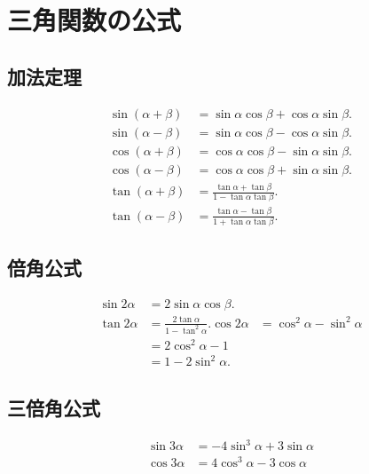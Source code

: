 ﻿%
    \section{三角関数の公式}
        \subsection{加法定理}
            \begin{align}
                \sin(\alpha+\beta) &= \sin\alpha\cos\beta + \cos\alpha\sin\beta. \\
                \sin(\alpha-\beta) &= \sin\alpha\cos\beta - \cos\alpha\sin\beta. \\
                \cos(\alpha+\beta) &= \cos\alpha\cos\beta - \sin\alpha\sin\beta. \\
                \cos(\alpha-\beta) &= \cos\alpha\cos\beta + \sin\alpha\sin\beta. \\
                \tan(\alpha+\beta) &= \frac{\tan\alpha+\tan\beta}{1-\tan\alpha\tan\beta}. \\
                \tan(\alpha-\beta) &= \frac{\tan\alpha-\tan\beta}{1+\tan\alpha\tan\beta}.
            \end{align}

        \subsection{倍角公式}
            \begin{align}
                \sin2\alpha &= 2\sin\alpha\cos\beta. \\
                \tan2\alpha &= \frac{2\tan\alpha}{1-\tan^{2}\alpha}.
                \cos2\alpha &= \cos^{2}\alpha-\sin^{2}\alpha \\
                            &= 2\cos^{2}\alpha-1 \\
                            &= 1-2\sin^{2}\alpha.
            \end{align}

        \subsection{三倍角公式}
            \begin{align}
                \sin3\alpha &= -4\sin^{3}\alpha+3\sin\alpha \\
                \cos3\alpha &= 4\cos^{3}\alpha-3\cos\alpha
            \end{align}

